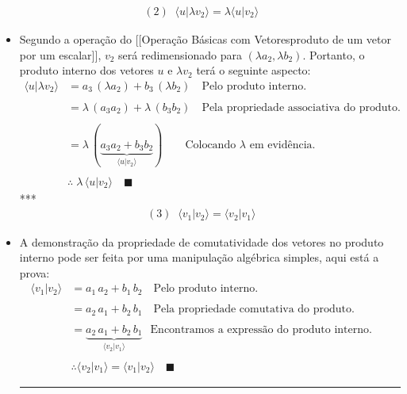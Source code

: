 \documentclass[
]{article}
\begin{document}
\begin{itemize}
  \[
  \begin{flalign*}
  (2)\;\;\langle u|\lambda v_2\rangle=\lambda\langle u|v_2\rangle&&
  \end{flalign*}
  \]
\item
  Segundo a operação do {[}{[}Operação Básicas com
  Vetores\textbar produto de um vetor por um escalar{]}{]}, \(v_2\) será
  redimensionado para \((\lambda a_2,\lambda b_2)\). Portanto, o produto
  interno dos vetores \(u\) e \(\lambda v_2\) terá o seguinte aspecto:\[
    \begin{flalign*}
    \langle u|\lambda v_2\rangle&=a_3\,(\lambda a_2)+b_3\,(\lambda b_2)\quad\text{Pelo produto interno.}&& \\ \\ 
    &=\lambda\,(a_3a_2)+\lambda\,(b_3b_2)\quad\text{Pela propriedade associativa do produto.}&& \\ \\
    &=\lambda\,(\underbrace{a_3a_2+b_3b_2}_{\langle u|v_2\rangle})\quad\quad\text{Colocando }\lambda\text{ em evidência.}&& \\ \\
    &\therefore\;\lambda\,\langle u|v_2\rangle\quad\blacksquare
    \end{flalign*}
    \] *** \[
  \begin{flalign*}
  (3)\;\;\langle v_1|v_2\rangle=\langle v_2|v_1\rangle&&
  \end{flalign*}
  \]
\item
  A demonstração da propriedade de comutatividade dos vetores no produto
  interno pode ser feita por uma manipulação algébrica simples, aqui
  está a prova:\[
    \begin{flalign*}
    \langle v_1|v_2\rangle&=a_1\,a_2+b_1\,b_2\quad\text{Pelo produto interno.}&& \\ \\
    &=a_2\,a_1+b_2\,b_1\quad\text{Pela propriedade comutativa do produto.}&& \\ \\
    &=\underbrace{a_2\,a_1+b_2\,b_1}_{\langle v_2|v_1\rangle}\;\;\,\text{Encontramos a expressão do produto interno.}&& \\ \\
    &\therefore\langle v_2|v_1\rangle=\langle v_1|v_2\rangle\quad\blacksquare&&
    \end{flalign*}
    \]

  \begin{center}\rule{0.5\linewidth}{0.5pt}\end{center}


\end{itemize}
\end{document}
